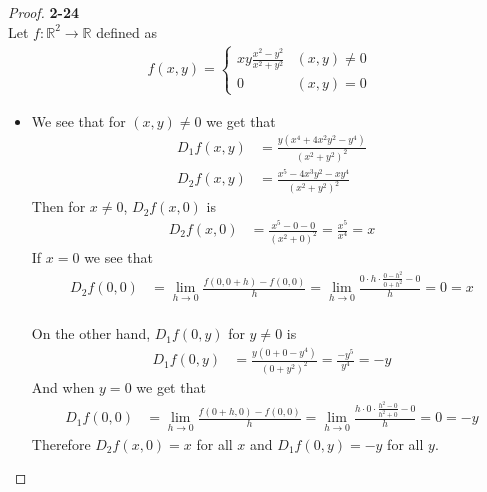 \documentclass[11pt]{article}
\newcommand{\R}{\mathbb{R}}
\theoremstyle{definition}
\begin{document}
\cleardoublepage
\begin{proof}{\textbf{2-24}}\\
Let $f:\R^2 \to \R$ defined as
\begin{align*}
    f(x,y) = \begin{cases}
        xy \frac{x^2 - y^2}{x^2 + y^2} & (x,y) \neq 0\\
        0 & (x,y) = 0
    \end{cases} 
\end{align*}
\begin{itemize}
\item [(a)] We see that for $(x,y)\neq 0$ we get that
\begin{align*}
    D_1f(x,y) &= \frac{y(x^4 + 4x^2y^2 - y^4)}{(x^2 + y^2)^2}\\
    D_2f(x,y) &= \frac{x^5 - 4x^3y^2 - xy^4}{(x^2 + y^2)^2}
\end{align*}
Then for $x\neq 0$, $D_2f(x,0)$ is
\begin{align*}
    D_2f(x,0) &= \frac{x^5 - 0 - 0}{(x^2 + 0)^2}
    = \frac{x^5}{x^4} = x
\end{align*}
If $x = 0$ we see that
\begin{align*}
    D_2f(0,0) &= \lim_{h \to 0}\frac{f(0, 0 + h) - f(0,0)}{h}
    = \lim_{h \to 0}\frac{0\cdot h \cdot \frac{0 - h^2}{0 + h^2} - 0}{h}
    = 0 = x
\end{align*}
\\
On the other hand, $D_1f(0,y)$ for $y \neq 0$ is
\begin{align*}
    D_1f(0,y) &= \frac{y(0 + 0 - y^4)}{(0 + y^2)^2}
    = \frac{- y^5}{y^4} = -y
\end{align*}
And when $y = 0$ we get that
\begin{align*}
    D_1f(0,0) &= \lim_{h \to 0}\frac{f(0 + h, 0) - f(0,0)}{h}
    = \lim_{h \to 0}\frac{h\cdot 0 \cdot \frac{h^2 - 0}{h^2 + 0} - 0}{h}
    = 0 = -y
\end{align*}
Therefore $D_2f(x,0) = x$ for all $x$ and $D_1f(0,y) = -y$ for all $y$.


\end{itemize}
\end{proof}
\end{document}

